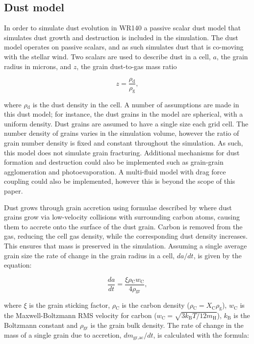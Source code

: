 \documentclass[fleqn,usenatbib]{mnras}
\newcommand{\rms}[1]{\ensuremath{_{\text{#1}}}}
\begin{document}
\subsection{Dust model}
\label{sec:dust-model}

In order to simulate dust evolution in WR140 a passive scalar dust model that simulates dust growth and destruction is included in the simulation.
The dust model operates on passive scalars, and as such simulates dust that is co-moving with the stellar wind.
Two scalars are used to describe dust in a cell, $a$, the grain radius in microns, and $z$, the grain dust-to-gas mass ratio

\begin{equation}
  z = \frac{\rho\rms{d}}{\rho\rms{g}},
\end{equation}

\noindent
where $\rho\rms{d}$ is the dust density in the cell.
A number of assumptions are made in this dust model; for instance, the dust grains in the model are spherical, with a uniform density.
Dust grains are assumed to have a single size each grid cell.
The number density of grains varies in the simulation volume, however the ratio of grain number density is fixed and constant throughout the simulation.
As such, this model does not simulate grain fracturing.
Additional mechanisms for dust formation and destruction could also be implemented such as grain-grain agglomeration and photoevaporation.
A multi-fluid model with drag force coupling could also be implemented, however this is beyond the scope of this paper.

Dust grows through grain accretion using formulae described by \cite{spitzer_jr._physical_2008} where dust grains grow via low-velocity collisions with surrounding carbon atoms, causing them to accrete onto the surface of the dust grain.
Carbon is removed from the gas, reducing the cell gas density, while the corresponding dust density increases.
This ensures that mass is preserved in the simulation.
Assuming a single average grain size the rate of change in the grain radius in a cell, $da/dt$, is given by the equation:

\begin{equation}
  \frac{da}{dt} = \frac{\xi \rho\rms{C} w\rms{C}}{4\rho\rms{gr}},
\end{equation}

\noindent
where $\xi$ is the grain sticking factor, $\rho\rms{C}$ is the carbon density ($\rho\rms{C} = X\rms{C} \rho\rms{g}$), $w\rms{C}$ is the Maxwell-Boltzmann RMS velocity for carbon ($w\rms{C} = \sqrt{3k\rms{B} T / 12m\rms{H}}$), $k\rms{B}$ is the Boltzmann constant and $\rho\rms{gr}$ is the grain bulk density.
The rate of change in the mass of a single grain due to accretion, $dm\rms{gr,ac}/dt$, is calculated with the formula:
\end{document}
